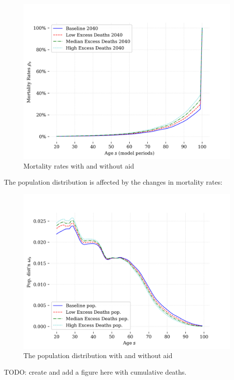 \documentclass[letterpaper,12pt]{article}
\theoremstyle{definition}
\begin{document}
\begin{spacing}{1.5}
\begin{figure}[h]
    \caption{Mortality rates with and without aid}
    \centering
    \includegraphics[scale=0.75]{./tables_figures/mortality_rates.png}
\end{figure}

The population distribution is affected by the changes in mortality rates:
\begin{figure}[h]
    \caption{The population distribution with and without aid}
    \centering
    \includegraphics[scale=0.75]{./tables_figures/pop_dist_2050.png}
\end{figure}

TODO: create and add a figure here with cumulative deaths.


\end{spacing}
\end{document}
